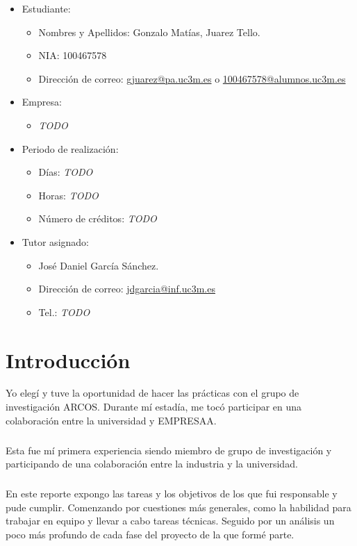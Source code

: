 \documentclass[12pt]{extreport} %
\begin{document}
\begin{itemize}
\item Estudiante:
  \begin{itemize}
  \item Nombres y Apellidos: Gonzalo Matías, Juarez Tello.
  \item NIA: 100467578
  \item Dirección de correo: \url{gjuarez@pa.uc3m.es} o \url{100467578@alumnos.uc3m.es}
  \end{itemize}

\item Empresa:
  \begin{itemize}
  \item \emph{TODO}
  \end{itemize}

\item Periodo de realización:
  \begin{itemize}
  \item Días: \emph{TODO}
  \item Horas: \emph{TODO}
  \item Número de créditos: \emph{TODO}
  \end{itemize}

\item Tutor asignado:
  \begin{itemize}
  \item José Daniel García Sánchez.
  \item Dirección de correo: \url{jdgarcia@inf.uc3m.es}
  \item Tel.: \emph{TODO}
  \end{itemize}
\end{itemize}

\chapter{Introducción}

Yo elegí y tuve la oportunidad de hacer las prácticas con el grupo de
investigación ARCOS. Durante mí estadía, me tocó participar en una
colaboración entre la universidad y EMPRESAA.

\paragraph{}
Esta fue mí primera experiencia siendo miembro de grupo de
investigación y participando de una colaboración entre la industria
y la universidad.

\paragraph{}
En este reporte expongo las tareas y los objetivos de los que fui
responsable y pude cumplir. Comenzando por cuestiones más generales,
como la habilidad para trabajar en equipo y llevar a cabo tareas
técnicas. Seguido por un análisis un poco más profundo de cada fase
del proyecto de la que formé parte.
\end{document}
